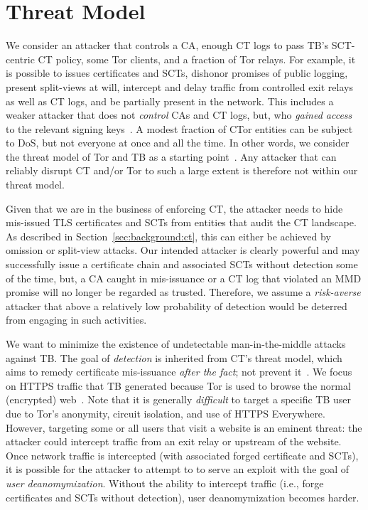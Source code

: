\section{Threat Model} \label{sec:adversary}
%
%
We consider an attacker that controls
	a CA,
	enough CT logs to pass TB's SCT-centric CT policy, 
	some Tor clients, and
	a fraction of Tor relays.
For example, it is possible to
	issues certificates and SCTs,
	dishonor promises of public logging,
	present split-views at will,
	intercept and delay traffic from controlled exit relays as well as CT logs,
		and
	be partially present in the network.
This includes a weaker attacker that does not \emph{control} CAs and CT logs,
but, who \emph{gained access} to the relevant signing keys~\cite{turktrust,%
gdca1-omission}.  A modest fraction of CTor entities can be subject to DoS, but
not everyone at once and all the time.  In other words, we consider the threat
model of Tor and TB as a starting point~\cite{tor,tor-browser}.  Any
attacker that can reliably disrupt CT and/or Tor to such a large extent is
therefore not within our threat model.

%
%
Given that we are in the business of enforcing CT, the attacker needs to hide
mis-issued TLS certificates and SCTs from entities that audit the CT landscape.
As described in Section~\ref{sec:background:ct}, this can either be achieved by
omission or split-view attacks.  Our intended attacker is clearly powerful and may
successfully issue a certificate chain and associated SCTs without detection
some of the time, but, a CA caught in mis-issuance or a CT log that violated an
MMD promise will no longer be regarded as trusted.  Therefore, we assume a
\emph{risk-averse} attacker that above a relatively low probability of detection
would be deterred from engaging in such activities.

%
%
We want to minimize the existence of undetectable man-in-the-middle attacks
against TB.  The goal of \emph{detection} is inherited from CT's threat
model, which aims to remedy certificate mis-issuance \emph{after the fact}; not
prevent it~\cite{ct/a}.  We focus on HTTPS traffic that TB generated
because Tor is used to browse the normal (encrypted) web~\cite{mani}.  Note that
it is generally \emph{difficult} to target a specific TB user due to
Tor's anonymity, circuit isolation, and use of HTTPS Everywhere.  However,
targeting some or all users that visit a website is an eminent threat: the
attacker could intercept traffic from an exit relay or upstream of the website.
Once network traffic is intercepted (with associated forged certificate and
SCTs), it is possible for the attacker to attempt to to serve an exploit with
the goal of \emph{user deanomymization}. Without the ability to intercept
traffic (i.e., forge certificates and SCTs without detection), user
deanomymization becomes harder.

